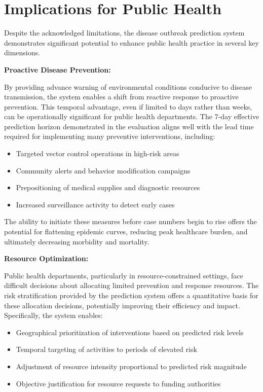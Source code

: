 \documentclass[12pt,a4paper]{report}
\begin{document}
\section{Implications for Public Health}
Despite the acknowledged limitations, the disease outbreak prediction system demonstrates significant potential to enhance public health practice in several key dimensions.

\textbf{Proactive Disease Prevention:}

By providing advance warning of environmental conditions conducive to disease transmission, the system enables a shift from reactive response to proactive prevention. This temporal advantage, even if limited to days rather than weeks, can be operationally significant for public health departments. The 7-day effective prediction horizon demonstrated in the evaluation aligns well with the lead time required for implementing many preventive interventions, including:

\begin{itemize}
    \item Targeted vector control operations in high-risk areas
    \item Community alerts and behavior modification campaigns
    \item Prepositioning of medical supplies and diagnostic resources
    \item Increased surveillance activity to detect early cases
\end{itemize}

The ability to initiate these measures before case numbers begin to rise offers the potential for flattening epidemic curves, reducing peak healthcare burden, and ultimately decreasing morbidity and mortality.

\textbf{Resource Optimization:}

Public health departments, particularly in resource-constrained settings, face difficult decisions about allocating limited prevention and response resources. The risk stratification provided by the prediction system offers a quantitative basis for these allocation decisions, potentially improving their efficiency and impact. Specifically, the system enables:

\begin{itemize}
    \item Geographical prioritization of interventions based on predicted risk levels
    \item Temporal targeting of activities to periods of elevated risk
    \item Adjustment of resource intensity proportional to predicted risk magnitude
    \item Objective justification for resource requests to funding authorities
\end{itemize}
\end{document}
